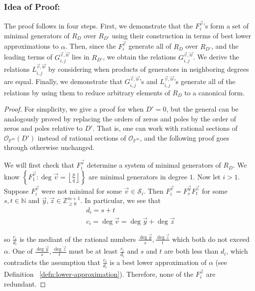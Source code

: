\documentclass{amsart}
\theoremstyle{plain}
\theoremstyle{definition}
\theoremstyle{remark}
\numberwithin{equation}{section}
\newcommand\sssec{\subsubsection}
\newcommand\bn{{\mathbb N}}
\newcommand\bp{{\mathbb P}}
\newcommand\bz{{\mathbb Z}}
\newcommand\mss{\mathscr{S}}
\begin{document}
\sssec*{Idea of Proof:}
The proof follows in four steps. First, we demonstrate that
the $F_{i}^{\vec{v}}$'s form a set of minimal generators of $R_D$
over $R_{D'}$ using their construction in terms of best lower
approximations to $\alpha$. Then, since the $F_{i}^{\vec{v}}$ generate
all of $R_D$ over $R_{D'}$, and the leading terms of
$G_{i,j}^{\vec v, \vec w}$ lies in $R_{D'}$, we obtain the
relations $G_{i, j}^{\vec{v}, \vec{w}}$. We derive the relations
$L_{i, j}^{\vec{v}, \vec{w}}$ by considering when products of
generators in neighboring degrees are equal. Finally, we demonstrate
that $G_{i, j}^{\vec{v}, \vec{w}}$'s and $L_{i, j}^{\vec{v}, \vec{w}}$'s
generate all of the relations by using them to reduce arbitrary
elements of
$R_D$ to a canonical form.

\begin{proof}
For simplicity, we give a proof for when $D' = 0$, but the general
can be analogously proved by replacing the orders of zeros and poles
by the order of zeros and poles relative to $D'$. That is,
one can work with rational sections of $\mathscr O_{\bp^m}(D')$
instead of rational sections of $\mathscr O_{\bp^m}$,
and the following proof goes through otherwise unchanged.

We will first check that $F^{\vec v}_i$ determine a system of minimal
generators of $R_D$. We know $\left\{F_{1}^{\vec{v}} \colon \deg \vec{v} =
\left\lfloor
\frac{p}{q} \right\rfloor \right\}$ are minimal generators in
degree $1$. Now let $i > 1$. Suppose $F_i^{\vec{v}}$ were not
minimal for some $\vec{v} \in \mss_i$. Then $F_i^{\vec{v}} =
F_{s}^{\vec{y}} F_{t}^{\vec{z}}$ for some $s, t \in \bn$ and
$\vec{y}, \vec{z} \in \bz_{ \geq 0}^{m + 1}$. In particular, we see
that 
\begin{align*}
	&d_i = s + t \\
	&c_i = \deg \vec{v} = \deg \vec{y} + \deg \vec{z}
\end{align*}

\noindent
so $\frac{c_i}{d_i}$ is the mediant of the rational numbers
$\frac{\deg \vec{y}}{s}, \frac{\deg \vec{z}}{t}$ which both
do not exceed $\alpha$. One of $\frac{\deg \vec{y}}{s},
\frac{\deg \vec{z}}{t}$ must be at least $\frac{c_i}{d_i}$
and $s$ and $t$ are both less than $d_i$, which contradicts the assumption that
$\frac{c_i}{d_i}$ is a best lower approximation of $\alpha$
(see Definition ~\ref{defn:lower-approximation}). Therefore, none of the $F_i^{\vec v}$ are redundant.


\end{proof}
\end{document}
